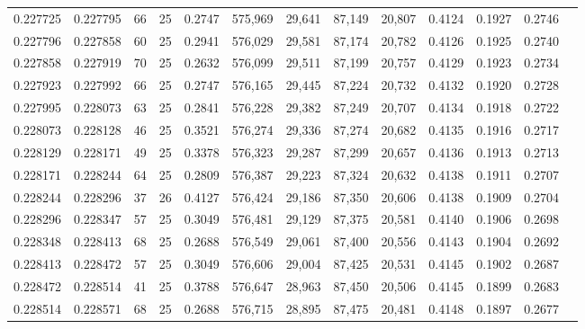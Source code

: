 \begin{tabular}{rrrrrrrrrrrrr}
0.227725 & 0.227795 &    66 &  25 &                                     0.2747 & 575,969 &  29,641 &  87,149 &  20,807 & 0.4124 & 0.1927 & 0.2746 \\
0.227796 & 0.227858 &    60 &  25 &                                     0.2941 & 576,029 &  29,581 &  87,174 &  20,782 & 0.4126 & 0.1925 & 0.2740 \\
0.227858 & 0.227919 &    70 &  25 &                                     0.2632 & 576,099 &  29,511 &  87,199 &  20,757 & 0.4129 & 0.1923 & 0.2734 \\
0.227923 & 0.227992 &    66 &  25 &                                     0.2747 & 576,165 &  29,445 &  87,224 &  20,732 & 0.4132 & 0.1920 & 0.2728 \\
0.227995 & 0.228073 &    63 &  25 &                                     0.2841 & 576,228 &  29,382 &  87,249 &  20,707 & 0.4134 & 0.1918 & 0.2722 \\
0.228073 & 0.228128 &    46 &  25 &                                     0.3521 & 576,274 &  29,336 &  87,274 &  20,682 & 0.4135 & 0.1916 & 0.2717 \\
0.228129 & 0.228171 &    49 &  25 &                                     0.3378 & 576,323 &  29,287 &  87,299 &  20,657 & 0.4136 & 0.1913 & 0.2713 \\
0.228171 & 0.228244 &    64 &  25 &                                     0.2809 & 576,387 &  29,223 &  87,324 &  20,632 & 0.4138 & 0.1911 & 0.2707 \\
0.228244 & 0.228296 &    37 &  26 &                                     0.4127 & 576,424 &  29,186 &  87,350 &  20,606 & 0.4138 & 0.1909 & 0.2704 \\
0.228296 & 0.228347 &    57 &  25 &                                     0.3049 & 576,481 &  29,129 &  87,375 &  20,581 & 0.4140 & 0.1906 & 0.2698 \\
0.228348 & 0.228413 &    68 &  25 &                                     0.2688 & 576,549 &  29,061 &  87,400 &  20,556 & 0.4143 & 0.1904 & 0.2692 \\
0.228413 & 0.228472 &    57 &  25 &                                     0.3049 & 576,606 &  29,004 &  87,425 &  20,531 & 0.4145 & 0.1902 & 0.2687 \\
0.228472 & 0.228514 &    41 &  25 &                                     0.3788 & 576,647 &  28,963 &  87,450 &  20,506 & 0.4145 & 0.1899 & 0.2683 \\
0.228514 & 0.228571 &    68 &  25 &                                     0.2688 & 576,715 &  28,895 &  87,475 &  20,481 & 0.4148 & 0.1897 & 0.2677 \\

\end{tabular}
